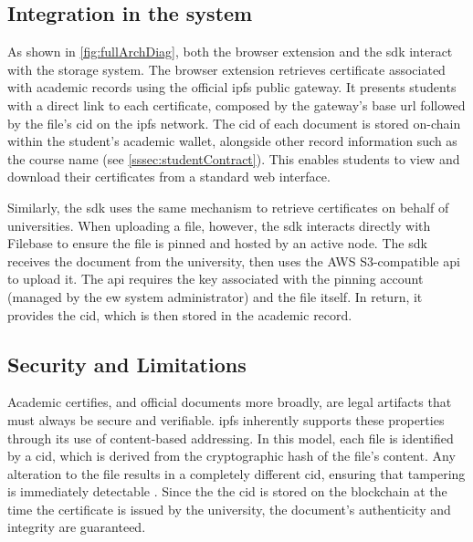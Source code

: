 \subsection{Integration in the system}
As shown in \cref{fig:fullArchDiag}, both the browser extension and the \acrshort{sdk} interact with the storage system. The browser extension retrieves certificate associated with academic records using the official \acrshort{ipfs} public gateway. It presents students with a direct link to each certificate, composed by the gateway's base \acrshort{url} followed by the file's \acrfull{cid} on the \acrshort{ipfs} network. The \acrshort{cid} of each document is stored on-chain within the student's academic wallet, alongside other record information such as the course name (see \cref{sssec:studentContract}). This enables students to view and download their certificates from a standard web interface.

Similarly, the \acrshort{sdk} uses the same mechanism to retrieve certificates on behalf of universities. When uploading a file, however, the \acrshort{sdk} interacts directly with Filebase to ensure the file is pinned and hosted by an active node. The \acrshort{sdk} receives the document from the university, then uses the AWS S3-compatible \acrshort{api} to upload it. The \acrshort{api} requires the key associated with the pinning account (managed by the \acrshort{ew} system administrator) and the file itself. In return, it provides the \acrshort{cid}, which is then stored in the academic record.

\subsection{Security and Limitations}
Academic certifies, and official documents more broadly, are legal artifacts that must always be secure and verifiable. \acrshort{ipfs} inherently supports these properties through its use of content-based addressing. In this model, each file is identified by a \acrshort{cid}, which is derived from the cryptographic hash of the file's content. Any alteration to the file results in a completely different \acrshort{cid}, ensuring that tampering is immediately detectable \cite{benet2014ipfscontentaddressed}. Since the the \acrshort{cid} is stored on the blockchain at the time the certificate is issued by the university, the document's authenticity and integrity are guaranteed.

